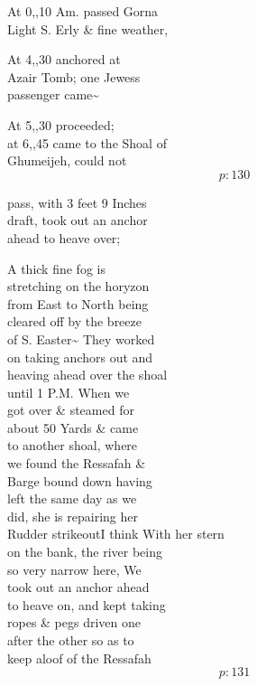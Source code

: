 \documentclass{report}
\begin{document}
	\par{
 	At 0,,10 Am. passed Gorna\ \\Light S. Erly \& fine weather,\ \\
	}

	\par{
 	At 4,,30 anchored at\ \\Azair Tomb; one Jewess\ \\passenger came\~{}\ \\
	}

	\par{
 	At 5,,30 proceeded;\ \\at 6,,45 came to the Shoal of\ \\Ghumeijeh, could not\ \\
  \[p: 130 \]

	}




	\par{
 	pass, with 3 feet 9 Inches\ \\draft, took out an anchor\ \\ahead to heave over;\ \\
	}

	\par{
 	A thick fine fog is\ \\stretching on the horyzon\ \\from East to North being\ \\cleared off by the breeze\ \\of S. Easter\~{} They worked\ \\on taking anchors out and\ \\heaving ahead over the shoal\ \\until 1 P.M. When we\ \\got over \& steamed for\ \\about 50 Yards \& came\ \\to another shoal, where\ \\we found the Ressafah \&\ \\Barge bound down having\ \\left the same day as we\ \\did, she is repairing her\ \\Rudder \lbrack strikeout\rbrack I think With her stern\ \\on the bank, the river being\ \\so very narrow here, We\ \\took out an anchor ahead\ \\to heave on, and kept taking\ \\ropes \& pegs driven one\ \\after the other so as to\ \\keep aloof of the Ressafah\ \\
  \[p: 131 \]

	}
\end{document}
